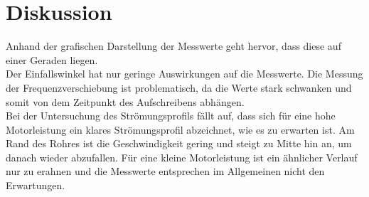 \section{Diskussion}
\label{sec:Diskussion}
Anhand der grafischen Darstellung der Messwerte geht hervor, dass diese auf einer Geraden liegen.
\\Der Einfallswinkel hat nur geringe Auswirkungen auf die Messwerte.
Die Messung der Frequenzverschiebung ist problematisch, da die Werte stark schwanken und somit von dem Zeitpunkt des Aufschreibens abhängen.
\\Bei der Untersuchung des Strömungsprofils fällt auf, dass sich für eine hohe Motorleistung ein klares Strömungsprofil abzeichnet, wie es zu erwarten ist.
Am Rand des Rohres ist die Geschwindigkeit gering und steigt zu Mitte hin an, um danach wieder abzufallen.
Für eine kleine Motorleistung ist ein ähnlicher Verlauf nur zu erahnen und die Messwerte entsprechen im Allgemeinen nicht den Erwartungen.
